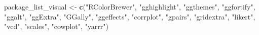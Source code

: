 \documentclass[]{book}
\newenvironment{Shaded}{\begin{snugshade}}{\end{snugshade}}
\newcommand{\KeywordTok}[1]{\textcolor[rgb]{0.13,0.29,0.53}{\textbf{#1}}}
\newcommand{\StringTok}[1]{\textcolor[rgb]{0.31,0.60,0.02}{#1}}
\newcommand{\NormalTok}[1]{#1}
\theoremstyle{definition}
\theoremstyle{definition}
\theoremstyle{definition}
\theoremstyle{remark}
\begin{document}
\begin{Shaded}
\begin{Highlighting}[]
\NormalTok{package_list_visual <-}\StringTok{ }\KeywordTok{c}\NormalTok{(}\StringTok{"RColorBrewer"}\NormalTok{,}
                         \StringTok{"gghighlight"}\NormalTok{,}
                         \StringTok{"ggthemes"}\NormalTok{, }
                         \StringTok{"ggfortify"}\NormalTok{,}
                         \StringTok{"ggalt"}\NormalTok{,}
                         \StringTok{"ggExtra"}\NormalTok{,}
                         \StringTok{"GGally"}\NormalTok{, }
                         \StringTok{"ggeffects"}\NormalTok{, }
                         \StringTok{"corrplot"}\NormalTok{,}
                         \StringTok{"gpairs"}\NormalTok{,}
                         \StringTok{"gridextra"}\NormalTok{,}
                         \StringTok{"likert"}\NormalTok{,}
                         \StringTok{"vcd"}\NormalTok{,}
                         \StringTok{"scales"}\NormalTok{,}
                         \StringTok{"cowplot"}\NormalTok{,}
                         \StringTok{"yarrr"}\NormalTok{)}
\end{Highlighting}
\end{Shaded}
\end{document}
